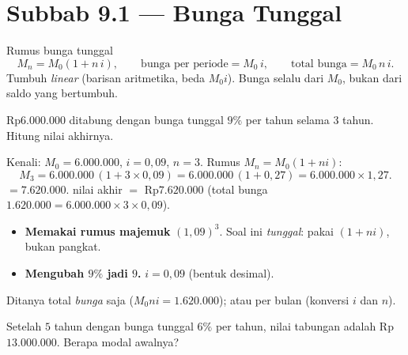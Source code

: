 \section*{Subbab 9.1 — Bunga Tunggal}

\begin{ingat}{Rumus bunga tunggal}
\[
M_n=M_0(1+n\,i),\qquad \text{bunga per periode}=M_0\,i,\qquad
\text{total bunga}=M_0\,n\,i.
\]
Tumbuh \emph{linear} (barisan aritmetika, beda $M_0 i$). Bunga selalu dari
$M_0$, bukan dari saldo yang bertumbuh.
\end{ingat}

\begin{soalbox}{}
Rp$6.000.000$ ditabung dengan bunga tunggal $9\%$ per tahun selama $3$ tahun.
Hitung nilai akhirnya.
\end{soalbox}

\jawab
{} Kenali: $M_0=6.000.000$, $i=0{,}09$, $n=3$.
 Rumus $M_n=M_0(1+ni)$:
\[
M_3=6.000.000\,(1+3\times0{,}09)=6.000.000\,(1+0{,}27)=6.000.000\times1{,}27.
\]
 $=7.620.000$.
\jadi nilai akhir $=$ Rp$7.620.000$ (total bunga $1.620.000=6.000.000\times3
\times0{,}09$).

\begin{jebakan}
\begin{itemize}[leftmargin=*,topsep=2pt]
  \item \textbf{Memakai rumus majemuk} $(1{,}09)^3$. Soal ini \emph{tunggal}:
  pakai $(1+ni)$, bukan pangkat.
  \item \textbf{Mengubah $9\%$ jadi $9$.} $i=0{,}09$ (bentuk desimal).
\end{itemize}
\end{jebakan}

\begin{variasi}
Ditanya total \emph{bunga} saja ($M_0 ni=1.620.000$); atau per bulan (konversi
$i$ dan $n$).
\end{variasi}

\begin{soalbox}{}
Setelah $5$ tahun dengan bunga tunggal $6\%$ per tahun, nilai tabungan adalah
Rp$13.000.000$. Berapa modal awalnya?
\end{soalbox}

